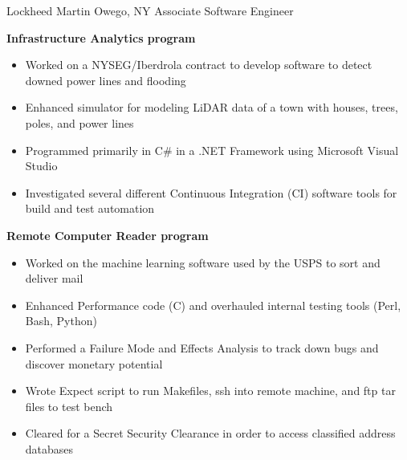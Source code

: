 
        {Lockheed Martin}
        {Owego, NY}
        {Associate Software Engineer}
        {}{
    \textbf{Infrastructure Analytics program}
    \begin{itemize}
        \item Worked on a NYSEG/Iberdrola contract to develop software to detect downed power lines and flooding
        \item Enhanced simulator for modeling LiDAR data of a town with houses, trees, poles, and power lines
        \item Programmed primarily in C\# in a .NET Framework using Microsoft Visual Studio
        \item Investigated several different Continuous Integration (CI) software tools for build and test automation
    \end{itemize}
    \textbf{Remote Computer Reader program}
    \begin{itemize}
        \item Worked on the machine learning software used by the USPS to sort and deliver mail
        \item Enhanced Performance code (C) and overhauled internal testing tools (Perl, Bash, Python)
        \item Performed a Failure Mode and Effects Analysis to track down bugs and discover monetary potential
        \item Wrote Expect script to run Makefiles, ssh into remote machine, and ftp tar files to test bench
        \item Cleared for a Secret Security Clearance in order to access classified address databases
    \end{itemize}
}

